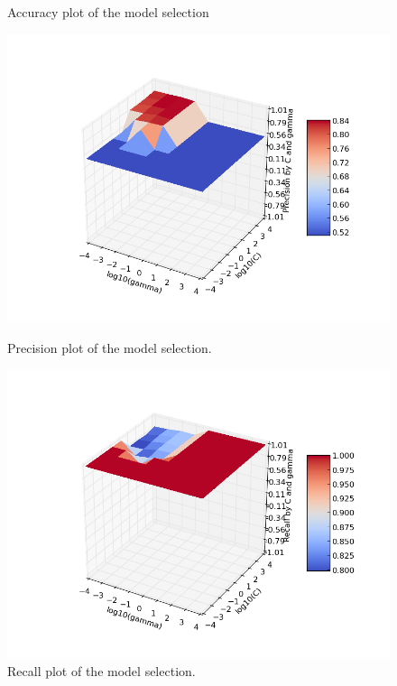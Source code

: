 \documentclass[aps,letterpaper,10pt]{revtex4}
\begin{document}
\begin{figure}[]
  \caption{Accuracy plot of the model selection}\label{fig:6}
\endminipage
\end{figure}

\begin{figure}[]
  \includegraphics[width=\linewidth]{img/pr_graph.png}
  \caption{Precision plot of the model selection.}\label{fig:7}
\endminipage\hfill
{}
  \includegraphics[width=\linewidth]{img/rec_graph.png}
  \caption{Recall plot of the model selection.}\label{fig:8}
\endminipage\hfill
{}%

\end{figure}
\end{document}
